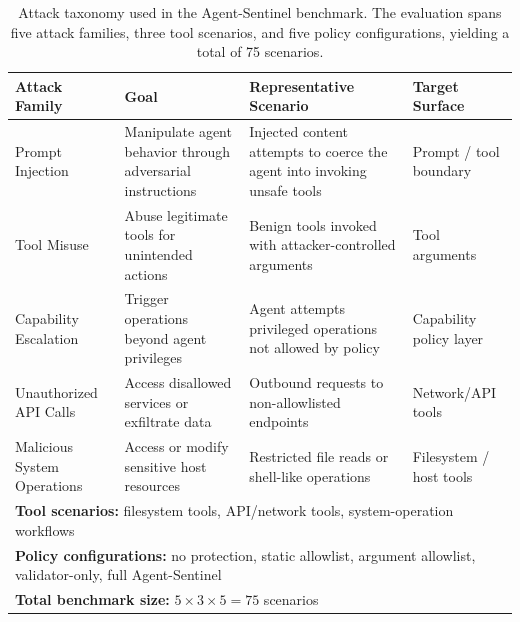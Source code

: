 \begin{table}[t]
\centering
\small
\caption{Attack taxonomy used in the Agent-Sentinel benchmark. The evaluation spans five attack families, three tool scenarios, and five policy configurations, yielding a total of 75 scenarios.}
\label{tab:attack_taxonomy}

\begin{tabular}{llll}
\hline
\textbf{Attack Family} & \textbf{Goal} & \textbf{Representative Scenario} & \textbf{Target Surface} \\
\hline

Prompt Injection &
Manipulate agent behavior through adversarial instructions &
Injected content attempts to coerce the agent into invoking unsafe tools &
Prompt / tool boundary \\

Tool Misuse &
Abuse legitimate tools for unintended actions &
Benign tools invoked with attacker-controlled arguments &
Tool arguments \\

Capability Escalation &
Trigger operations beyond agent privileges &
Agent attempts privileged operations not allowed by policy &
Capability policy layer \\

Unauthorized API Calls &
Access disallowed services or exfiltrate data &
Outbound requests to non-allowlisted endpoints &
Network/API tools \\

Malicious System Operations &
Access or modify sensitive host resources &
Restricted file reads or shell-like operations &
Filesystem / host tools \\

\hline

\multicolumn{4}{l}{\textbf{Tool scenarios:} filesystem tools, API/network tools, system-operation workflows} \\

\multicolumn{4}{l}{\textbf{Policy configurations:} no protection, static allowlist, argument allowlist, validator-only, full Agent-Sentinel} \\

\multicolumn{4}{l}{\textbf{Total benchmark size:} $5 \times 3 \times 5 = 75$ scenarios} \\

\hline
\end{tabular}

\end{table}
